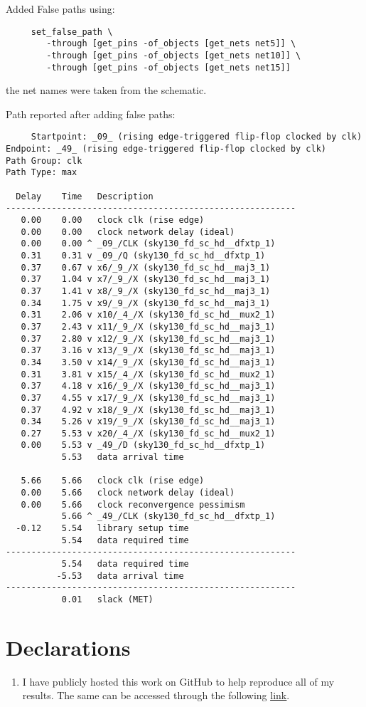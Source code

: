 \documentclass[12pt,a4paper]{article}
\begin{document}
Added False paths using:
\begin{verbatim}
     set_false_path \
        -through [get_pins -of_objects [get_nets net5]] \
        -through [get_pins -of_objects [get_nets net10]] \
        -through [get_pins -of_objects [get_nets net15]]
\end{verbatim}

\noindent the net names were taken from the schematic.

Path reported after adding false paths:

\begin{verbatim}
     Startpoint: _09_ (rising edge-triggered flip-flop clocked by clk)
Endpoint: _49_ (rising edge-triggered flip-flop clocked by clk)
Path Group: clk
Path Type: max

  Delay    Time   Description
---------------------------------------------------------
   0.00    0.00   clock clk (rise edge)
   0.00    0.00   clock network delay (ideal)
   0.00    0.00 ^ _09_/CLK (sky130_fd_sc_hd__dfxtp_1)
   0.31    0.31 v _09_/Q (sky130_fd_sc_hd__dfxtp_1)
   0.37    0.67 v x6/_9_/X (sky130_fd_sc_hd__maj3_1)
   0.37    1.04 v x7/_9_/X (sky130_fd_sc_hd__maj3_1)
   0.37    1.41 v x8/_9_/X (sky130_fd_sc_hd__maj3_1)
   0.34    1.75 v x9/_9_/X (sky130_fd_sc_hd__maj3_1)
   0.31    2.06 v x10/_4_/X (sky130_fd_sc_hd__mux2_1)
   0.37    2.43 v x11/_9_/X (sky130_fd_sc_hd__maj3_1)
   0.37    2.80 v x12/_9_/X (sky130_fd_sc_hd__maj3_1)
   0.37    3.16 v x13/_9_/X (sky130_fd_sc_hd__maj3_1)
   0.34    3.50 v x14/_9_/X (sky130_fd_sc_hd__maj3_1)
   0.31    3.81 v x15/_4_/X (sky130_fd_sc_hd__mux2_1)
   0.37    4.18 v x16/_9_/X (sky130_fd_sc_hd__maj3_1)
   0.37    4.55 v x17/_9_/X (sky130_fd_sc_hd__maj3_1)
   0.37    4.92 v x18/_9_/X (sky130_fd_sc_hd__maj3_1)
   0.34    5.26 v x19/_9_/X (sky130_fd_sc_hd__maj3_1)
   0.27    5.53 v x20/_4_/X (sky130_fd_sc_hd__mux2_1)
   0.00    5.53 v _49_/D (sky130_fd_sc_hd__dfxtp_1)
           5.53   data arrival time

   5.66    5.66   clock clk (rise edge)
   0.00    5.66   clock network delay (ideal)
   0.00    5.66   clock reconvergence pessimism
           5.66 ^ _49_/CLK (sky130_fd_sc_hd__dfxtp_1)
  -0.12    5.54   library setup time
           5.54   data required time
---------------------------------------------------------
           5.54   data required time
          -5.53   data arrival time
---------------------------------------------------------
           0.01   slack (MET)
\end{verbatim}

\section{Declarations}
\begin{enumerate}
    \item I have publicly hosted this work on GitHub to help reproduce all of my results. The same can be accessed through the following \href{https://github.com/iamkarthikbk/ee5311-2025}{\underline{link}}.
\end{enumerate}
\end{document}

